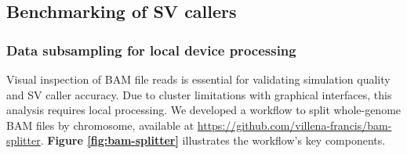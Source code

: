 \newpage 

\subsection{Benchmarking of SV callers}

\subsubsection{Data subsampling for local device processing}

Visual inspection of BAM file reads is essential for validating simulation 
quality and SV caller accuracy. Due to cluster limitations with graphical 
interfaces, this analysis requires local processing. We developed a workflow to 
split whole-genome BAM files by chromosome, available at 
\url{https://github.com/villena-francis/bam-splitter}. 
\textbf{Figure \ref{fig:bam-splitter}} illustrates the workflow's key 
components.


